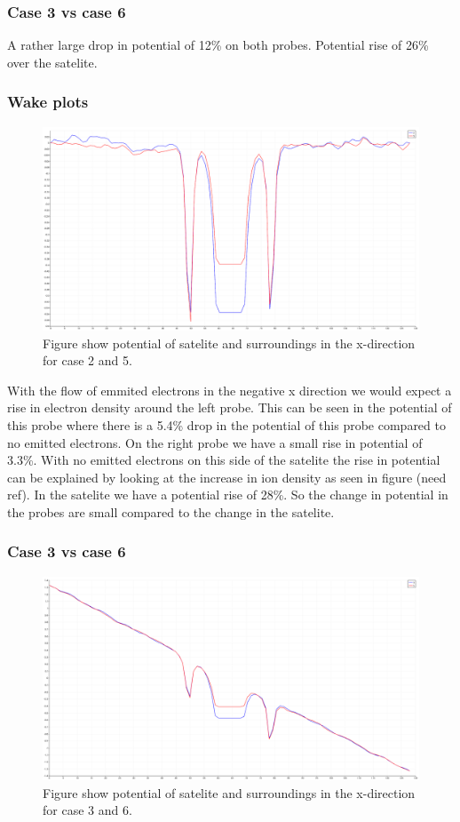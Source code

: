 \subsubsection{Case 3 vs case 6}

A rather large drop in potential of 12\% on both probes. Potential rise of 26\% over the satelite.  
    

    
    
\subsubsection{Wake plots}
    

\begin{figure}
    \includegraphics[width = 0.5 \textwidth]{images/pot_case25.png}
    \caption{Figure show potential of satelite and surroundings in the x-direction for case 2 and 5.}
\end{figure}

With the flow of emmited electrons in the negative x direction we would expect a rise in electron density around the left probe.
This can be seen in the potential of this probe where there is a 5.4\% drop in the potential of this probe compared to no emitted
electrons. On the right probe we have a small rise in potential of 3.3\%. With no emitted electrons on this side of the satelite the rise in
potential can be explained by looking at the increase in ion density as seen in figure (need ref).
In the satelite we have a potential rise of 28\%. So the change in potential in the probes are small compared to the change in the satelite.

\subsubsection{Case 3 vs case 6}

\begin{figure}
    \includegraphics[width = 0.5 \textwidth]{images/pot_case36.png}
    \caption{Figure show potential of satelite and surroundings in the x-direction for case 3 and 6.}
\end{figure}

